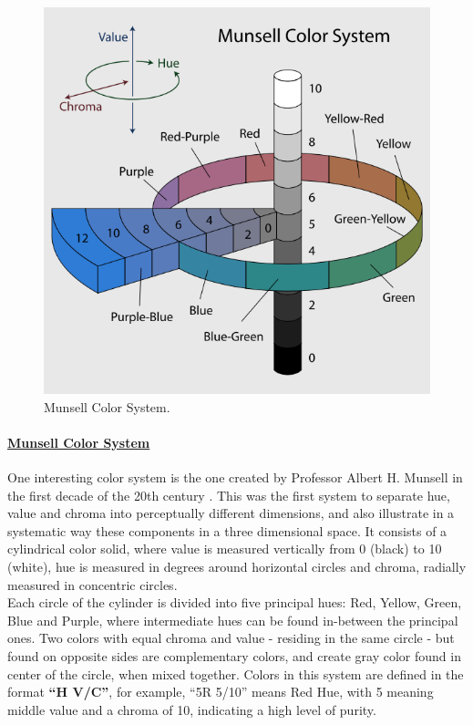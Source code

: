 \begin{figure}
  \centering
  \vspace{-\baselineskip}
  \includegraphics[width=\linewidth]{images/background/MunsellSystem.png}
  \caption[Munsell Color System Representation]{Munsell Color System.\protect\footnotemark{}}
  \label{fig:munsell}
\end{figure}
%
\paragraph{\ul{Munsell Color System}} One interesting color system is the one created by
Professor Albert H. Munsell in the first decade of the 20th century \cite{Munsell1919}. This was the first system to separate
hue, value and chroma into perceptually different dimensions, and also illustrate in a systematic way these
components in a three dimensional space. It consists of a cylindrical color solid, where value is measured
vertically from 0 (black) to 10 (white), hue is measured in degrees around horizontal circles and chroma,
radially measured in concentric circles. \\
Each circle of the cylinder is divided into five principal hues: Red, Yellow, Green, Blue and Purple, where
intermediate hues can be found
in-between the principal ones. Two colors with equal chroma and value - residing in the same circle - but
found on opposite sides are complementary colors, and create gray color found in center of the
circle, when mixed together.  Colors in this system are defined in the format \textbf{“H V/C”}, for example,
“5R 5/10” means Red Hue, with 5 meaning middle value and a chroma of 10, indicating a high level of purity. \par
%
